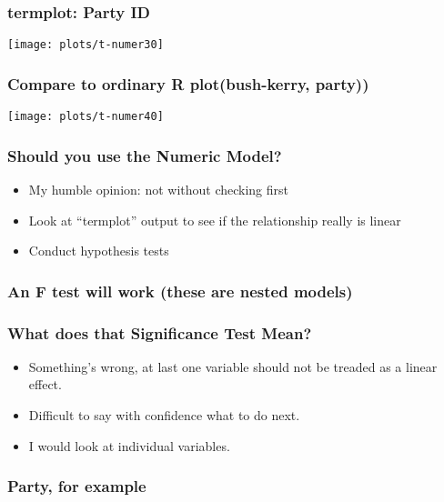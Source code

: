 \documentclass[10pt,english]{beamer}
\begin{document}
\begin{frame}[containsverbatim]
\frametitle{termplot: Party ID}


\texttt{[image: plots/t-numer30]}

\end{frame}

\begin{frame}
\frametitle{Compare to ordinary R plot(bush-kerry, party))}


\texttt{[image: plots/t-numer40]}

\end{frame}

\begin{frame}[containsverbatim]
\frametitle{Should you use the Numeric Model?}
\begin{itemize}
\item My humble opinion: not without checking first
\item Look at ``termplot'' output to see if the relationship really is
linear
\item Conduct hypothesis tests
\end{itemize}
\end{frame}

\begin{frame}[containsverbatim]
\frametitle{An F test will work (these are nested models)}




\end{frame}

\begin{frame}[containsverbatim]
\frametitle{What does that Significance Test Mean?}
\begin{itemize}
\item Something's wrong, at last one variable should not be treaded as a
linear effect.
\item Difficult to say with confidence what to do next. 
\item I would look at individual variables.
\end{itemize}
\end{frame}

\begin{frame}
\frametitle{Party, for example}







\end{frame}
\end{document}

